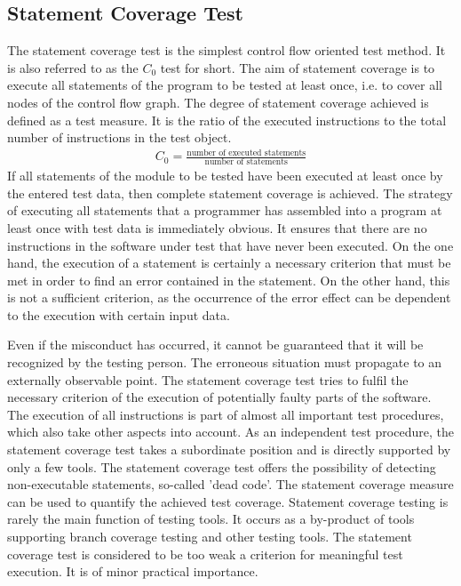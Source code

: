 	
	\subsection{Statement Coverage Test}
	The statement coverage test is the simplest control flow oriented test method. It is also referred to as the $C_0$ test for short. The aim of statement coverage is to execute all statements of the program to be tested at least once, i.e. to cover all nodes of the control flow graph. The degree of statement coverage achieved is defined as a test measure. It is the ratio of the executed instructions to the total number of instructions in the test object.
		\begin{align*}
		C_0 = \frac{\textrm{number of executed statements}}{\textrm{number of statements}}
		\end{align*}
	If all statements of the module to be tested have been executed at least once by the entered test data, then complete statement coverage is achieved. The strategy of executing all statements that a programmer has assembled into a program at least once with test data is immediately obvious. It ensures that there are no instructions in the software under test that have never been executed. On the one hand, the execution of a statement is certainly a necessary criterion that must be met in order to find an error contained in the statement. On the other hand, this is not a sufficient criterion, as the occurrence of the error effect can be dependent to the execution with certain input data. 
	
	Even if the misconduct has occurred, it cannot be guaranteed that it will be recognized by the testing person. The erroneous situation must propagate to an externally observable point. The statement coverage test tries to fulfil the necessary criterion of the execution of potentially faulty parts of the software. The execution of all instructions is part of almost all important test procedures, which also take other aspects into account. As an independent test procedure, the statement coverage test takes a subordinate position and is directly supported by only a few tools. The statement coverage test offers the possibility of detecting non-executable statements, so-called 'dead code'. The statement coverage measure can be used to quantify the achieved test coverage. Statement coverage testing is rarely the main function of testing tools. It occurs as a by-product of tools supporting branch coverage testing and other testing tools. The statement coverage test is considered to be too weak a criterion for meaningful test execution. It is of minor practical importance.

